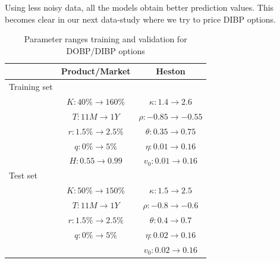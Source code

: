 \documentclass[12pt,a4paper,oneside]{book}
\begin{document}
Using less noisy data, all the models obtain better prediction values. This becomes clear in our next data-study where we try to price DIBP options.



\begin{table}\centering 
\begin{tabular}[t]{lcc}\toprule
            &   Product/Market  &  Heston   \\ \midrule
            Training set && \\\addlinespace
 & $K: 40 \% \rightarrow 160\%$ & $\kappa: 1.4 \rightarrow 2.6$  \\\addlinespace
			   & $T: 11M \rightarrow 1Y$      &  $\rho: -0.85 \rightarrow -0.55$       \\\addlinespace
			   & $r: 1.5\% \rightarrow 2.5\%  $   & $\theta: 0.35 \rightarrow 0.75$         \\\addlinespace
			   & $q: 0 \%  \rightarrow 5 \%$    & $\eta: 0.01 \rightarrow 0.16$            \\\addlinespace
			   &  $H: 0.55 \rightarrow 0.99$      &  $v_0: 0.01 \rightarrow 0.16$          \\\addlinespace
			    Test set && \\\addlinespace
 & $K: 50 \% \rightarrow 150\%$ & $\kappa: 1.5 \rightarrow 2.5$  \\\addlinespace
			   & $T: 11M \rightarrow 1Y$      &  $\rho: -0.8 \rightarrow -0.6$       \\\addlinespace
			   & $r: 1.5\% \rightarrow 2.5\%  $   & $\theta: 0.4 \rightarrow 0.7$       \\\addlinespace
			   & $q: 0 \%  \rightarrow 5 \%$    & $\eta: 0.02 \rightarrow 0.16$           \\\addlinespace
			   &      &  $v_0: 0.02 \rightarrow 0.16$         \\\bottomrule
\end{tabular}
\caption{Parameter ranges training and validation for DOBP/DIBP options }\label{table_DOBP}
\end{table}
\end{document}
